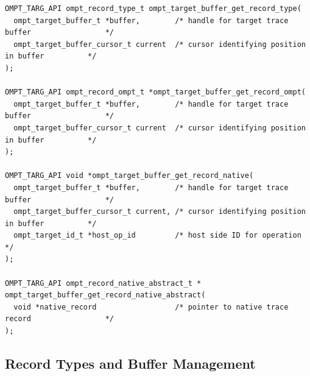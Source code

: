 \documentclass{article}
\begin{document}
\begin{verbatim}
OMPT_TARG_API ompt_record_type_t ompt_target_buffer_get_record_type(
  ompt_target_buffer_t *buffer,        /* handle for target trace buffer                 */
  ompt_target_buffer_cursor_t current  /* cursor identifying position in buffer          */
);

OMPT_TARG_API ompt_record_ompt_t *ompt_target_buffer_get_record_ompt(
  ompt_target_buffer_t *buffer,        /* handle for target trace buffer                 */
  ompt_target_buffer_cursor_t current  /* cursor identifying position in buffer          */
);
   
OMPT_TARG_API void *ompt_target_buffer_get_record_native(
  ompt_target_buffer_t *buffer,        /* handle for target trace buffer                 */
  ompt_target_buffer_cursor_t current, /* cursor identifying position in buffer          */
  ompt_target_id_t *host_op_id         /* host side ID for operation                     */
);
  
OMPT_TARG_API ompt_record_native_abstract_t *
ompt_target_buffer_get_record_native_abstract(
  void *native_record                  /* pointer to native trace record                 */
);
\end{verbatim}

\clearpage  
\subsection{Record Types and Buffer Management}
\label{appendix:ompt-records}
\end{document}

